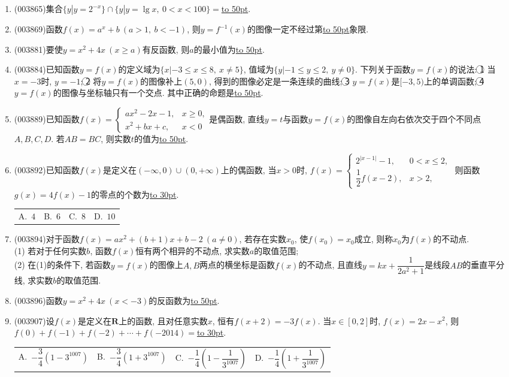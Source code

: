 \documentclass[10pt,a4paper]{article}
\newcommand{\blank}[1]{\underline{\hbox to #1pt{}}}
\newcommand{\fourch}[4]{\par\begin{tabular}{p{.23\textwidth}p{.23\textwidth}p{.23\textwidth}p{.23\textwidth}}
A.~#1 &B.~#2& C.~#3& D.~#4
\end{tabular}}
\begin{document}
\begin{enumerate}[1.]
{}
\item {\tiny (003865)}集合$\{y|y=2^{-x}\}\cap\{y|y=\lg x, \ 0<x<100\}=$\blank{50}.
\item {\tiny (003869)}函数$f(x)=a^x+b \ (a>1, \ b<-1)$, 则$y=f^{-1}(x)$的图像一定不经过第\blank{50}象限.
\item {\tiny (003881)}要使$y=x^2+4x \ (x\ge a)$有反函数, 则$a$的最小值为\blank{50}.
\item {\tiny (003884)}已知函数$y=f(x)$的定义域为$\{x|-3\le x\le 8, \ x\ne 5\}$, 值域为$\{y|-1\le y\le 2, \ y\ne 0\}$. 下列关于函数$y=f(x)$的说法: \textcircled{1} 当$x=-3$时, $y=-1$; \textcircled{2} 将$y=f(x)$的图像补上$(5,0)$, 得到的图像必定是一条连续的曲线; \textcircled{3} $y=f(x)$是$[-3,5)$上的单调函数; \textcircled{4} $y=f(x)$的图像与坐标轴只有一个交点. 其中正确的命题是\blank{50}.
\item {\tiny (003889)}已知函数$f(x)=\begin{cases}ax^2-2x-1, & x\ge 0,\\ x^2+bx+c, & x<0\end{cases}$是偶函数, 直线$y=t$与函数$y=f(x)$的图像自左向右依次交于四个不同点$A,B,C,D$. 若$AB=BC$, 则实数$t$的值为\blank{50}.
\item {\tiny (003892)}已知函数$f(x)$是定义在$(-\infty,0)\cup (0,+\infty)$上的偶函数, 当$x>0$时, $f(x)=\begin{cases}
2^{|x-1|}-1, & 0<x\le 2,\\\dfrac 12f(x-2), & x>2,
\end{cases}$ 则函数$g(x)=4f(x)-1$的零点的个数为\blank{30}.
\fourch{$4$}{$6$}{$8$}{$10$}
\item {\tiny (003894)}对于函数$f(x)=ax^2+(b+1)x+b-2 \ (a\ne 0)$, 若存在实数$x_0$, 使$f(x_0)=x_0$成立, 则称$x_0$为$f(x)$的不动点.\\
(1) 若对于任何实数$b$, 函数$f(x)$恒有两个相异的不动点, 求实数$a$的取值范围;\\
(2) 在(1)的条件下, 若函数$y=f(x)$的图像上$A,B$两点的横坐标是函数$f(x)$的不动点, 且直线$y=kx+\dfrac{1}{2a^2+1}$是线段$AB$的垂直平分线, 求实数$b$的取值范围.
\item {\tiny (003896)}函数$y=x^2+4x \ (x<-3)$的反函数为\blank{50}.
\item {\tiny (003907)}设$f(x)$是定义在$\mathbf{R}$上的函数, 且对任意实数$x$, 恒有$f(x+2)=-3f(x)$. 当$x\in [0,2]$时, $f(x)=2x-x^2$, 则$f(0)+f(-1)+f(-2)+\cdots+f(-2014)=$\blank{30}.
\fourch{$-\dfrac 34(1-3^{1007})$}{$-\dfrac 34(1+3^{1007})$}{$-\dfrac 14\left(1-\dfrac{1}{3^{1007}}\right)$}{$-\dfrac 14\left(1+\dfrac{1}{3^{1007}}\right)$}

\end{enumerate}
\end{document}
